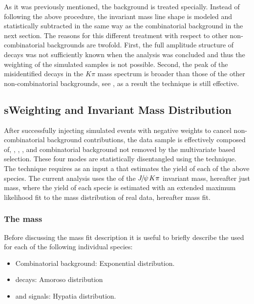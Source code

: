 As it was previously mentioned, the \LbJpsippi background is treated specially. Instead of following the above
procedure, the \LbJpsippi invariant mass line shape is modeled and statistically subtracted in the same way as the
combinatorial background in the next section. The reasons for this different treatment with respect to other
non-combinatorial backgrounds are twofold. First, the full amplitude structure of \LbJpsippi decays was not
sufficiently known\cite{Aaij:2014zoa} when the analysis was concluded and thus the weighting of the simulated samples is not possible.
Second, the peak of the misidentified \LbJpsippi decays in the \jpsi$K\pi$ mass spectrum is broader than those
of the other non-combinatorial backgrounds, see , as a result the \sPlot technique is still
effective.


\subsection{sWeighting and Invariant Mass Distribution}
\label{sWeighting_and_mass}

After successfully injecting simulated events with negative weights to cancel non-combinatorial background contributions,
the data sample is effectively composed of, \BdJpsiKpi, \BsJpsiKpi, \LbJpsippi, and combinatorial background not removed by the
multivariate based selection. These four modes are statistically disentangled using the \sPlot technique\cite{splot}.
The technique requires as an input a \pdf that estimates the yield of each
of the above species. The current analysis uses the \pdf of the ${J\mskip -3mu/\mskip -2mu\psi\mskip 2mu} K\pi$ invariant mass, hereafter just mass, where the yield of each specie
is estimated with an extended maximum likelihood fit to the mass distribution of real data, hereafter mass fit.

\subsubsection{The mass \pdf}
Before discussing the mass fit description it is useful to briefly describe the \pdfs used for each of the following individual species:

\begin{itemize}
\item Combinatorial background: Exponential distribution.
\item \LbJpsippi decays: Amoroso distribution\cite{Amoroso}
\item \Bd and \Bs signals: Hypatia distribution\cite{Santos:2013gra}.
\end{itemize}

